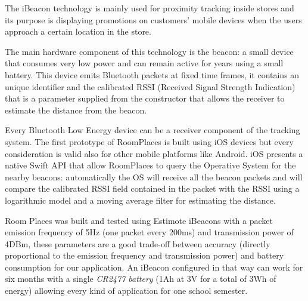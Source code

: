 The iBeacon technology is mainly used for proximity tracking inside stores and its purpose is displaying promotions on customers’ mobile devices when the users approach a certain location in the store. 

The main hardware component of this technology is the beacon: a small device that consumes very low power and can remain active for years using a small battery. This device emits Bluetooth packets at fixed time frames, it contains an unique identifier and the calibrated RSSI (Received Signal Strength Indication) that is a parameter supplied from the constructor that allows the receiver to estimate the distance from the beacon.

Every Bluetooth Low Energy device can be a receiver component of the tracking system. The first prototype of RoomPlaces is built using iOS devices but every consideration is valid also for other mobile platforms like Android. iOS presents a native Swift API that allow RoomPlaces to query the Operative System for the nearby beacons: automatically the OS will receive all the beacon packets and will compare the calibrated RSSI field contained in the packet with the RSSI using a logarithmic model and a moving average filter for estimating the distance.

Room Places was built and tested using Estimote iBeacons \cite{estimote} with a packet emission frequency of 5Hz (one packet every 200ms) and transmission power of 4DBm, these parameters are a good trade-off between accuracy (directly proportional to the emission frequency and transmission power) and battery consumption for our application. An iBeacon configured in that way can work for six months with a single \textit{CR2477 battery} (1Ah at 3V for a total of 3Wh of energy) allowing every kind of application for one school semester.

